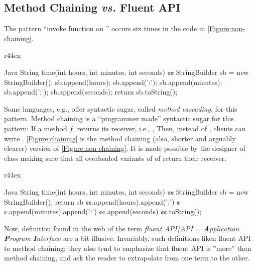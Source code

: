 \subsection{Method Chaining \emph{vs.} Fluent API}
The pattern ``invoke function on '' occurs
  six times in the code in \cref{Figure:non-chaining}.

\begin{wrapfigure}[10]{r}{44ex}
  \caption{\label{Figure:non-chaining}%
    Recurring invocations of the pattern ``invoke function on the same 
      receiver''.
  }
  \begin{lcode}[minipage,width=\linewidth]{Java}
String time(int hours, int minutes, int seconds) {¢¢
  StringBuilder sb = new StringBuilder();
  sb.append(hours);
  sb.append(':');
  sb.append(minutes);
  sb.append(':');
  sb.append(seconds);
  return sb.toString();
}\end{lcode}
\end{wrapfigure}

Some languages, e.g., \Smalltalk offer syntactic sugar, called \emph{method cascading}, for this pattern. 
Method chaining is a ``programmer made'' syntactic sugar for this pattern: 
  If a method $f$, returns its receiver, i.e., , 
  Then, instead of \mbox{}, clients can write \mbox{}. 
\cref{Figure:chaining} is the method chaining
  (also, shorter and arguably clearer) version of 
  \cref{Figure:non-chaining}.
It is made possible by the designer of class  making sure that all overloaded variants of 
  of  return their receiver. 

\begin{wrapfigure}[10]{r}{44ex}
  \caption{\label{Figure:chaining}%
    Method chaining onto an object of class .
  }
  \begin{lcode}[minipage,width=\linewidth]{Java}
String time(int hours, int minutes, int seconds) {¢¢
  StringBuilder sb = new StringBuilder();
    return sb
      ¢¢.append(hours).append(':')
      ¢¢.append(minutes).append(':')
      ¢¢.append(seconds)
      ¢¢.toString();
}\end{lcode}
\end{wrapfigure}
  

Now, definition found in the web of the term \emph{fluent API†{API =
    \textbf Application \textbf Program \textbf Interface
}} are a bit illusive.
Invariably, such definitions liken fluent API to method chaining;
  they also tend to emphasize that fluent API is ‟more” than method
  chaining, and ask the reader to extrapolate from one term to the other.

